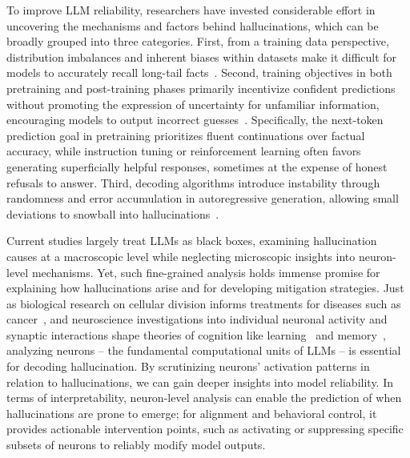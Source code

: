 \documentclass[dvipsnames]{article}
\begin{document}
To improve LLM reliability, researchers have invested considerable effort in uncovering the mechanisms and factors behind hallucinations, which can be broadly grouped into three categories. First, from a training data perspective, distribution imbalances and inherent biases within datasets make it difficult for models to accurately recall long-tail facts~\citep{DBLP:conf/naacl/SunXZLD24,DBLP:conf/acl/LiLSDSLJJL22}. 
Second, training objectives in both pretraining and post-training phases primarily incentivize confident predictions without promoting the expression of uncertainty for unfamiliar information, encouraging models to output incorrect guesses~\citep{DBLP:journals/corr/abs-2509-04664}. Specifically, the next-token prediction goal in pretraining prioritizes fluent continuations over factual accuracy, while instruction tuning or reinforcement learning often favors generating superficially helpful responses, sometimes at the expense of honest refusals to answer. 
Third, decoding algorithms introduce instability through randomness and error accumulation in autoregressive generation, allowing small deviations to snowball into hallucinations~\citep{DBLP:conf/icml/ZhangPMLS24,DBLP:conf/nips/LeePXPFSC22,DBLP:conf/nips/KapoorGRCPBWDGW24}.

Current studies largely treat LLMs as black boxes, examining hallucination causes at a macroscopic level while neglecting microscopic insights into neuron-level mechanisms. Yet, such fine-grained analysis holds immense promise for explaining how hallucinations arise and for developing mitigation strategies. 
Just as biological research on cellular division informs treatments for diseases such as cancer~\citep{collins1997cell,matthews2022cell}, and neuroscience investigations into individual neuronal activity and synaptic interactions shape theories of cognition like learning~\citep{DBLP:journals/natmi/LuczakMK22} and memory~\citep{mongillo2008synaptic,lisman2018memory}, analyzing neurons -- the fundamental computational units of LLMs -- is essential for decoding hallucination. By scrutinizing neurons' activation patterns in relation to hallucinations, we can gain deeper insights into model reliability. In terms of interpretability, neuron-level analysis can enable the prediction of when hallucinations are prone to emerge; for alignment and behavioral control, it provides actionable intervention points, such as activating or suppressing specific subsets of neurons to reliably modify model outputs.
\end{document}
